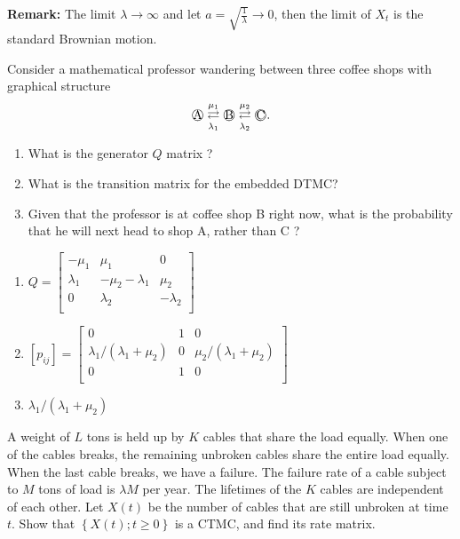 \documentclass[  11pt]{article}
\newcommand{\snum}[1]{ \raisebox{.5pt}{\textcircled{\raisebox{-.9pt} {#1}}}}
\newcommand{\set}[1]{\left\{#1\right\}}
\begin{document}
\begin{ExerciseList}
{\bf Remark:} The limit $\lambda\to \infty$ and let $a=\sqrt{\frac{1}{\lambda}}\to 0$,
then the limit of $X_t$ is the standard Brownian motion.

\Exercise

Consider a mathematical professor wandering between three coffee shops
with graphical structure
\[ \snum{A} \underset{\lambda_1}{\overset{\mu_{1}}\rightleftarrows}
 \snum{B} \underset{\lambda_2}{\overset{\mu_{2}}\rightleftarrows}
\snum{C}.
\]
\begin{enumerate}
\item What is the generator $Q$ matrix ? 

\item What is  the transition matrix for the embedded DTMC?
\item  Given that the professor is at coffee shop B right now,
what is the probability that he will next head to shop A,
rather than C ?
 \end{enumerate}

\Answer
\begin{enumerate}
\item
$Q=\begin{bmatrix}
-\mu_1 & \mu_1 & 0 \\
\lambda_1 & -\mu_2-\lambda_1 & \mu_2   \\
0 & \lambda_2 &-\lambda_2   \\
\end{bmatrix}
$ 
\item
$[p_{ij}]=\begin{bmatrix}
0 & 1 & 0 \\
\lambda_1/(\lambda_1+\mu_2) & 0 & \mu_2/(\lambda_1+\mu_2)   \\
0 & 1 &0   \\
\end{bmatrix}
$
\item
$\lambda_1/(\lambda_1+\mu_2) $
 \end{enumerate}

\Exercise[origin={4.1, p 138}]
 A weight of $L$ tons is held up by $K$ cables that share the
 load equally. When one of the cables breaks, the remaining unbroken cables share the entire load equally. When the last cable breaks, we have a failure. The failure rate of a cable subject to $M$ tons of load is $\lambda M$ per year. The lifetimes of the $K$ cables are independent of each other. Let $X(t)$ be the number of cables that are still unbroken at time $t$.
  Show that $\set{X(t); t \geq 0}$ is a CTMC, and find its rate matrix.
 

\end{ExerciseList}
\end{document}
